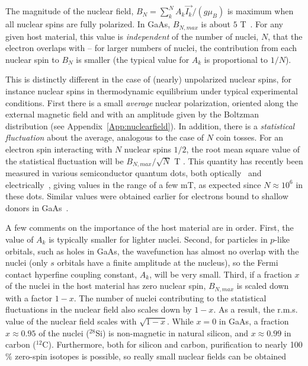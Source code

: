 \documentclass[12pt,aps,nofootinbib]{revtex4-1}
\begin{document}
The magnitude of the nuclear field, $B_N = \sum_k^N A_k \vec{I_k} / (g \mu_B)$ is maximum when all nuclear spins are fully polarized. In GaAs, $B_{N,max}$ is about $5$ T~\cite{paget77}. For any given host material, this value is \emph{independent} of the number of nuclei, $N$, that the electron overlaps with -- for larger numbers of nuclei, the contribution from each nuclear spin to $B_N$ is smaller (the typical value for $A_k$ is proportional to $1/N$).

This is distinctly different in the case of (nearly) unpolarized nuclear spins, for instance nuclear spins in thermodynamic equilibrium under typical experimental conditions. First there is a small \emph{average} nuclear polarization, oriented along the external magnetic field and with an amplitude given by the Boltzman distribution (see Appendix~\ref{App:nuclearfield}). In addition, there is a \emph{statistical fluctuation} about the average, analogous to the case of $N$ coin tosses. For an electron spin interacting with $N$ nuclear spins $1/2$, the root mean square value of the statistical fluctuation will be $B_{N,max} /\sqrt{N}$ T \cite{merkulov02,khaetskii02}. This quantity has recently been measured in various semiconductor quantum dots, both optically~\cite{braun05,dutt05} and electrically~\cite{johnson05,koppens05}, giving values in the range
of a few mT, as expected since $N\approx 10^6$ in these dots. Similar values were obtained earlier for electrons bound to shallow donors in GaAs~\cite{dzhioev02}.

A few comments on the importance of the host material are in order. 
First, the value of $A_k$ is typically smaller for lighter nuclei. Second, for particles in $p$-like orbitals, such as holes in GaAs, the wavefunction has almost no overlap with the nuclei (only $s$ orbitals have a finite amplitude at the nucleus), so the Fermi contact hyperfine coupling constant, $A_k$, will be very small. Third, if a fraction $x$ of the nuclei in the host material has zero nuclear spin, $B_{N,max}$ is scaled down with a factor $1-x$. The number of nuclei contributing to the statistical fluctuations in the nuclear field also scales down by $1-x$. As a result, the r.m.s. value of the nuclear field scales with $\sqrt{1-x}$. While $x=0$ in GaAs, a fraction $x\approx0.95$ of the nuclei ($^{28}$Si) is non-magnetic in natural silicon, and $x\approx0.99$ in carbon ($^{12}$C). Furthermore, both for silicon and carbon, purification to nearly 100$\%$ zero-spin isotopes is possible, so really small nuclear fields can be obtained
\end{document}
